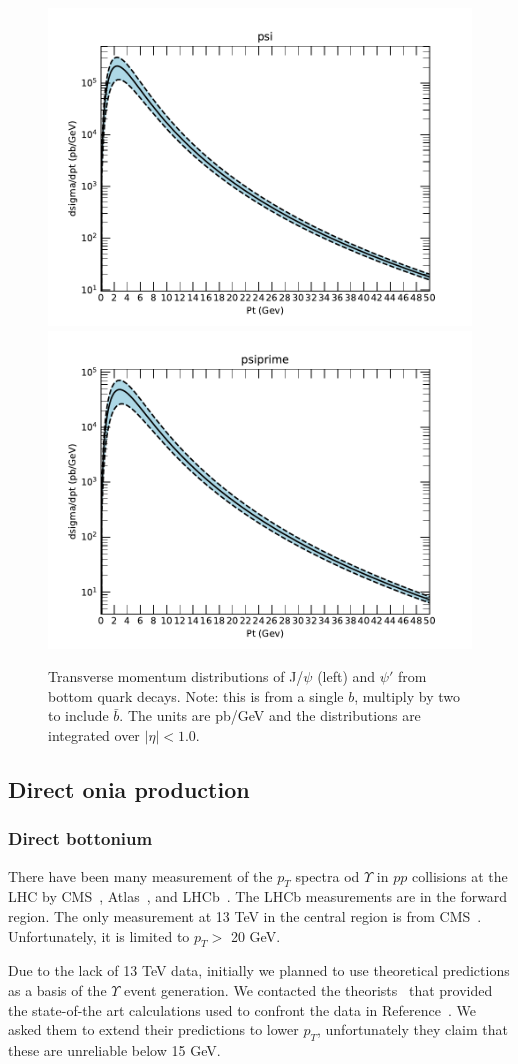 \documentclass[12pt]{article}
\begin{document}
\begin{figure}
  \includegraphics[width=0.48\linewidth]{../oniaFromB/psi.pdf}
  \includegraphics[width=0.48\linewidth]{../oniaFromB/psiprime.pdf}
  \caption{Transverse momentum distributions of J/$\psi$ (left) 
and $\psi'$ from bottom quark decays. Note: this is from a single $b$, 
multiply by two to include $\bar{b}$. The units are pb/GeV and the 
distributions 
are integrated over $|\eta|<1.0$.}
  \label{fig:bpsi}
\end{figure}

  
\subsection{Direct onia production}
\label{sec:onia}

\subsubsection{Direct bottonium}
\label{sec:upsilon}

There have been many measurement of the $p_T$ spectra od $\Upsilon$ in $pp$ collisions
at the LHC by CMS~\cite{Khachatryan:2010zg, Chatrchyan:2013yna, Khachatryan:2015qpa, Sirunyan:2017qdw},
Atlas~\cite{Aad:2011xv, Aad:2012dlq},
  and LHCb~\cite{Aaij:2018pfp, Aaij:2015awa, Aaij:2014nwa, Aaij:2013yaa, LHCb:2012aa}.
  The LHCb measurements are in the forward region.  The only measurement at 13 TeV
  in the central region is from CMS~\cite{Sirunyan:2017qdw}.  Unfortunately, it is limited
  to $p_T >$ 20 GeV.

  Due to the lack of 13 TeV data, initially we planned to use theoretical predictions
  as a basis of the $\Upsilon$ event generation.
  We contacted the theorists~\cite{Han:2014kxa}
  that provided the state-of-the art calculations used to
  confront the data in Reference~\cite{Sirunyan:2017qdw}.  We
  asked them to extend their predictions to lower $p_T$, unfortunately they claim that these
  are unreliable below 15 GeV.
\end{document}
